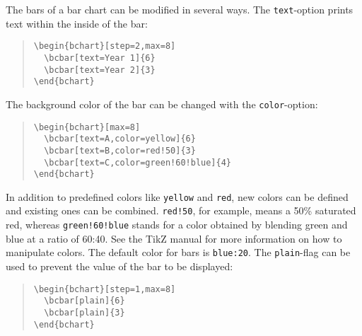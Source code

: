 \documentclass{article}
\begin{document}
The bars of a bar chart can be modified in several ways. The \texttt{text}-option prints text within the inside of the bar:
\begin{quote}\small
\begin{verbatim}
\begin{bchart}[step=2,max=8]
  \bcbar[text=Year 1]{6}
  \bcbar[text=Year 2]{3}
\end{bchart}
\end{verbatim}
\end{quote}
\begin{quote}
\begin{bchart}[step=2,max=8]
\end{bchart}
\end{quote}
The background color of the bar can be changed with the \texttt{color}-option:
\begin{quote}\small
\begin{verbatim}
\begin{bchart}[max=8]
  \bcbar[text=A,color=yellow]{6}
  \bcbar[text=B,color=red!50]{3}
  \bcbar[text=C,color=green!60!blue]{4}
\end{bchart}
\end{verbatim}
\end{quote}
\begin{quote}
\begin{bchart}[max=8]
\end{bchart}
\end{quote}
In addition to predefined colors like \texttt{yellow} and \texttt{red}, new colors can be defined and existing ones can be combined. \texttt{red!50}, for example, means a 50\% saturated red, whereas \texttt{green!60!blue} stands for a color obtained by blending green and blue at a ratio of 60:40. See the TikZ manual for more information on how to manipulate colors. The default color for bars is \texttt{blue:20}. The \texttt{plain}-flag can be used to prevent the value of the bar to be displayed:
\begin{quote}\small
\begin{verbatim}
\begin{bchart}[step=1,max=8]
  \bcbar[plain]{6}
  \bcbar[plain]{3}
\end{bchart}
\end{verbatim}
\end{quote}
\begin{quote}
\begin{bchart}[step=1,max=8]
\end{bchart}
\end{quote}
\end{document}
